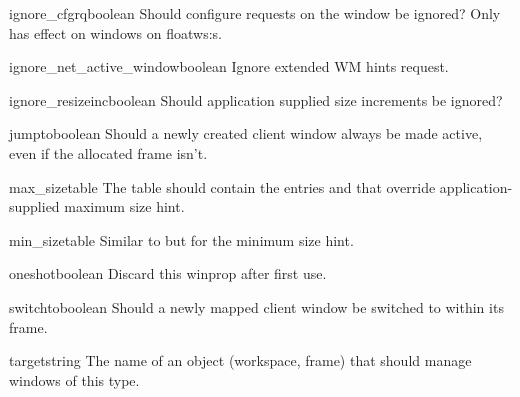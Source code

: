 \begin{winprop}{ignore_cfgrq}{boolean}
    Should configure requests on the window be ignored?
    Only has effect on windows on floatws:s. 
\end{winprop}


\begin{winprop}{ignore_net_active_window}{boolean}
    Ignore extended WM hints  request. 
\end{winprop}


\begin{winprop}{ignore_resizeinc}{boolean}
    Should application supplied size increments be ignored?
\end{winprop}


\begin{winprop}{jumpto}{boolean}
    Should a newly created client window always be made
    active, even if the allocated frame isn't. 
\end{winprop}


\begin{winprop}{max_size}{table}
    The table should contain the entries  and  that
    override application-supplied maximum size hint. 
\end{winprop}


\begin{winprop}{min_size}{table}
    Similar to  but for the minimum size hint. 
\end{winprop}


\begin{winprop}{oneshot}{boolean}
    Discard this winprop after first use. 
\end{winprop}


\begin{winprop}{switchto}{boolean}
    Should a newly mapped client window be switched to within
    its frame.
\end{winprop}
        

\begin{winprop}{target}{string}
    The name of an object (workspace, frame) that should manage 
    windows of this type. 
\end{winprop}

